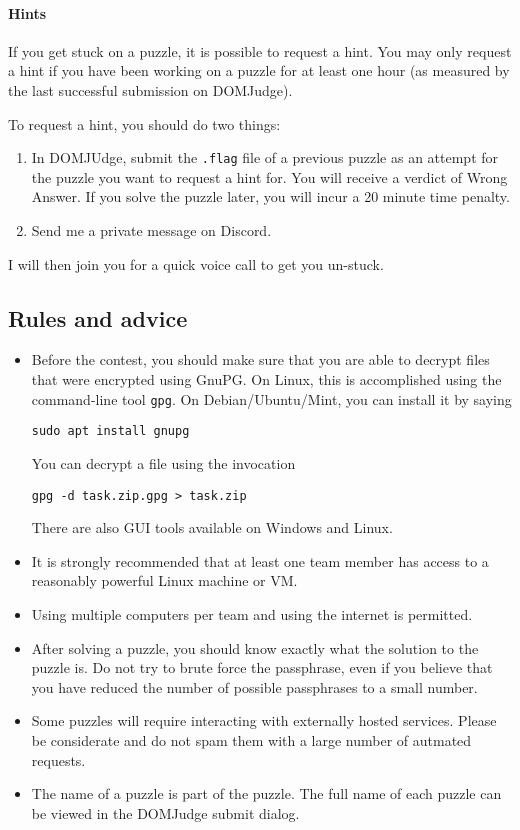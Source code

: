 \documentclass[fontsize=10pt,a4paper,DIV=12,parskip=half]{scrarticle}
\begin{document}
\paragraph{Hints}
If you get stuck on a puzzle, it is possible to request a hint. You may only
request a hint if you have been working on a puzzle for at least one hour
(as measured by the last successful submission on DOMJudge).

To request a hint, you should do two things:
\begin{enumerate}
	\item In DOMJUdge, submit the \texttt{.flag} file of a previous puzzle as an attempt for the puzzle you
		want to request a hint for. You will receive a verdict of Wrong Answer. If you solve
		the puzzle later, you will incur a 20 minute time penalty.
	\item Send me a private message on Discord.
\end{enumerate}

I will then join you for a quick voice call to get you un-stuck.

\subsection*{Rules and advice}
\begin{itemize}
	\item Before the contest, you should make sure that you are able to decrypt
		files that were encrypted using GnuPG. On Linux, this is accomplished
		using the command-line tool \texttt{gpg}. On Debian/Ubuntu/Mint, you can
		install it by saying
		\begin{center}
			\texttt{sudo apt install gnupg}
		\end{center}
		You can decrypt a file using the invocation
		\begin{center}
			\texttt{gpg -d task.zip.gpg > task.zip}
		\end{center}
		There are also GUI tools available on Windows and Linux.
	\item It is strongly recommended that at least one team member has access
		to a reasonably powerful Linux machine or VM.
	\item Using multiple computers per team and using the internet is permitted.
	\item After solving a puzzle, you should know exactly what the solution to
		the puzzle is. Do not try to brute force the passphrase, even if you
		believe that you have reduced the number of possible passphrases to a
		small number.
	\item Some puzzles will require interacting with externally hosted services.
		Please be considerate and do not spam them with a large number of autmated
		requests.
	\item The name of a puzzle is part of the puzzle. The full name of each puzzle
		can be viewed in the DOMJudge submit dialog.
\end{itemize}
\end{document}
